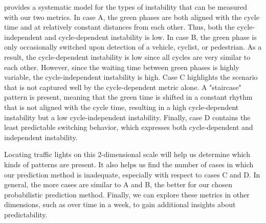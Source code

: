  provides a systematic model for the types of instability that can be measured with our two metrics. In case A, the green phases are both aligned with the cycle time and at relatively constant distances from each other. Thus, both the cycle-independent and cycle-dependent instability is low. In case B, the green phase is only occasionally switched upon detection of a vehicle, cyclist, or pedestrian. As a result, the cycle-dependent instability is low since all cycles are very similar to each other. However, since the waiting time between green phases is highly variable, the cycle-independent instability is high. Case C highlights the scenario that is not captured well by the cycle-dependent metric alone. A "staircase" pattern is present, meaning that the green time is shifted in a constant rhythm that is not aligned with the cycle time, resulting in a high cycle-dependent instability but a low cycle-independent instability. Finally, case D contains the least predictable switching behavior, which expresses both cycle-dependent and independent instability. 

Locating traffic lights on this 2-dimensional scale will help us determine which kinds of patterns are present. It also helps us find the number of cases in which our prediction method is inadequate, especially with respect to cases C and D. In general, the more cases are similar to A and B, the better for our chosen probabilistic prediction method. Finally, we can explore these metrics in other dimensions, such as over time in a week, to gain additional insights about predictability.

